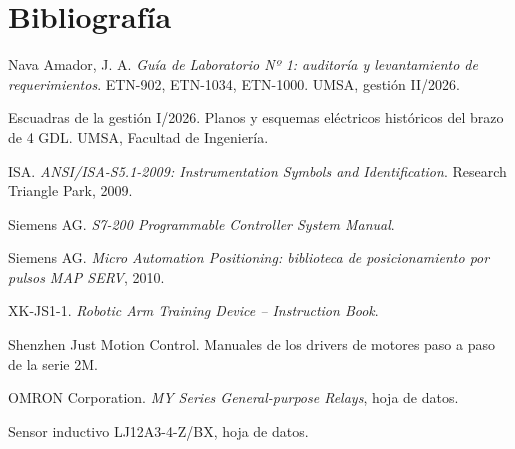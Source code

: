 \documentclass[a4paper,11pt]{article}
\begin{document}
\section*{Bibliografía}
\begin{enumerate}[label={[\arabic*]}, leftmargin=*]
\item Nava Amador, J. A. \emph{Guía de Laboratorio Nº 1: auditoría y levantamiento de requerimientos}. ETN-902, ETN-1034, ETN-1000. UMSA, gestión II/2026.
\item Escuadras de la gestión I/2026. Planos y esquemas eléctricos históricos del brazo de 4 GDL. UMSA, Facultad de Ingeniería.
\item ISA. \emph{ANSI/ISA-S5.1-2009: Instrumentation Symbols and Identification}. Research Triangle Park, 2009.
\item Siemens AG. \emph{S7-200 Programmable Controller System Manual}.
\item Siemens AG. \emph{Micro Automation Positioning: biblioteca de posicionamiento por pulsos MAP SERV}, 2010.
\item XK-JS1-1. \emph{Robotic Arm Training Device -- Instruction Book}.
\item Shenzhen Just Motion Control. Manuales de los drivers de motores paso a paso de la serie 2M.
\item OMRON Corporation. \emph{MY Series General-purpose Relays}, hoja de datos.
\item Sensor inductivo LJ12A3-4-Z/BX, hoja de datos.
\end{enumerate}
\end{document}
